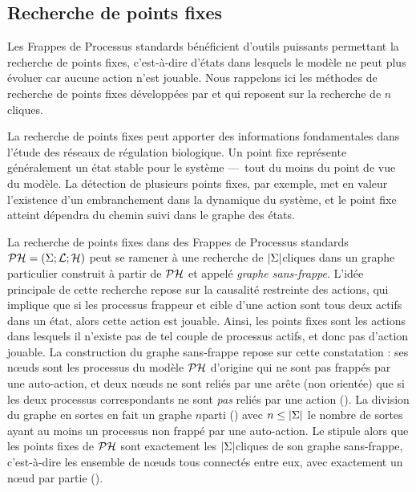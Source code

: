 \subsection{Recherche de points fixes}

Les Frappes de Processus standards bénéficient d'outils puissants permettant la recherche
de points fixes, c'est-à-dire d'états dans lesquels le modèle ne peut plus évoluer
car aucune action n'est jouable.
Nous rappelons ici les méthodes de recherche de points fixes développées par
 et qui reposent sur la recherche de $n$\nbd cliques.

\myskip

La recherche de points fixes peut apporter des informations fondamentales
dans l'étude des réseaux de régulation biologique.
Un point fixe représente généralement un état stable pour le système
---~tout du moins du point de vue du modèle.
La détection de plusieurs points fixes, par exemple,
met en valeur l'existence d'un embranchement dans la dynamique du système,
et le point fixe atteint dépendra du chemin suivi dans le graphe des états.

La recherche de points fixes dans des Frappes de Processus standards $\mathcal{PH} = (\Sigma; \mathcal{L}; \mathcal{H})$
peut se ramener à une recherche de $|\Sigma|$\nbd cliques
dans un graphe particulier construit à partir de $\mathcal{PH}$ et appelé \emph{graphe sans-frappe}.
L'idée principale de cette recherche repose sur la causalité restreinte des actions,
qui implique que si les processus frappeur et cible d'une action sont tous deux actifs
dans un état, alors cette action est jouable.
Ainsi, les points fixes sont les actions dans lesquels il n'existe pas de tel couple de processus
actifs, et donc pas d'action jouable.
La construction du graphe sans-frappe repose sur cette constatation :
ses nœuds sont les processus du modèle $\mathcal{PH}$ d'origine
qui ne sont pas frappés par une auto-action,
et deux nœuds ne sont reliés par une arête (non orientée) que si les deux processus
correspondants ne sont \emph{pas} reliés par une action ().
La division du graphe en sortes en fait un graphe $n$\nbd parti ()
avec $n \leq |\Sigma|$ le nombre de sortes ayant au moins un processus
non frappé par une auto-action.
Le  stipule alors que les points fixes de $\mathcal{PH}$ sont exactement
les $|\Sigma|$\nbd cliques de son graphe sans-frappe,
c'est-à-dire les ensemble de nœuds tous connectés entre eux,
avec exactement un nœud par partie ().

